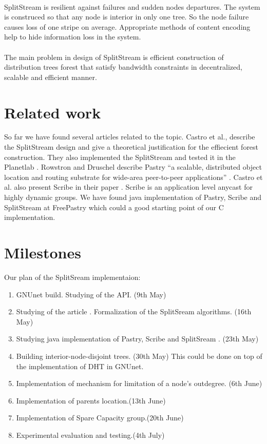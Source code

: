 \documentclass[a4paper,10pt]{article}
\begin{document}
\paragraph{}
SplitStream is resilient against failures and sudden nodes departures. The system is construced so that any node is interior
in only one tree. So the node failure causes loss of one stripe on average. Appropriate methods of content encoding help to
hide information loss in the system.
\paragraph{}
The main problem in design of  SplitStream is efficient construction of distribution trees forest that satisfy bandwidth
constraints in decentralized, scalable and efficient manner.

\section{Related work}
So far we have found several articles related to the topic. Castro et al.\cite{castro1}, \cite{castro2} describe the 
SplitStream design and give a theoretical justification for the effiecient forest construction. They also implemented
the SplitStream and tested it in the Planetlab \cite{Planetlab}. Rowstron and Druschel\cite{Rowstron} describe Pastry
``a scalable, distributed object location and routing substrate for wide-area peer-to-peer applications'' \cite{Rowstron}.
Castro et al. also present Scribe in their paper \cite{castro3}. Scribe is an application level anycast for highly dynamic
groups.
We have found java implementation of Pastry, Scribe and 
SplitStream at FreePastry \cite{FreePastry} which could a good starting point of our C implementation.

\section{Milestones}
Our plan of the SplitSream implementaion:
\begin{enumerate}
 \item GNUnet\cite{GNUnet} build. Studying of the API. (9th May)
 \item Studying of the article \cite{castro1}. Formalization of the SplitSream algorithms. (16th May)
 \item Studying java implementation of Pastry, Scribe and SplitSream \cite{FreePastry}. (23th May)
 \item Building interior-node-disjoint trees. (30th May)
 \subitem This could be done on top of the implementation of DHT in GNUnet.
 \item Implementation of mechanism for limitation of a node's outdegree. (6th June)
 \item Implementation of parents location.(13th June)
 \item Implementation of Spare Capacity group.(20th June)
 \item Experimental evaluation and testing.(4th July)
\end{enumerate}

{}

\end{document}
